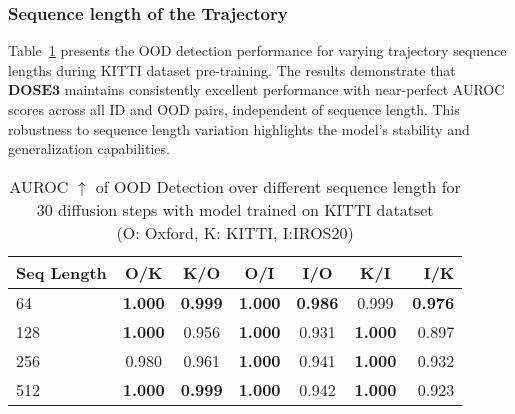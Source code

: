 \subsubsection{Sequence length of the Trajectory}
Table~\ref{tab:ablation_seqlen} presents the \ac{OOD} detection performance for varying trajectory sequence lengths during KITTI dataset pre-training. The results demonstrate that $\mathbf{DOSE3}$ maintains consistently excellent performance with near-perfect AUROC scores across all \ac{ID} and \ac{OOD} pairs, independent of sequence length. This robustness to sequence length variation highlights the model's stability and generalization capabilities.
\begin{table}[t]
\caption{AUROC $\uparrow$ of OOD Detection over different sequence length for 30 diffusion steps with model trained on KITTI datatset\\
(O: Oxford, K: KITTI, I:IROS20)}
    \vskip 0.15in
    \begin{adjustbox}{width=0.68\linewidth,center}
    \begin{tabular}{lcccccr}
    \toprule
        \textbf{Seq Length} & \textbf{O/K} & \textbf{K/O} & \textbf{O/I} & \textbf{I/O} & \textbf{K/I} & \textbf{I/K}\\
    \midrule
        64   & \textbf{1.000} & \textbf{0.999} & \textbf{1.000} & \textbf{0.986} & 0.999 & \textbf{0.976} \\
        128  & \textbf{1.000} & 0.956 & \textbf{1.000} & 0.931 & \textbf{1.000} & 0.897\\
        256  & 0.980 & 0.961 & \textbf{1.000} & 0.941 & \textbf{1.000} & 0.932\\
        512  & \textbf{1.000} & \textbf{0.999} & \textbf{1.000} & 0.942 & \textbf{1.000} & 0.923\\
    \bottomrule
    \end{tabular}
    \end{adjustbox}
    \vskip -0.1in
    
    \label{tab:ablation_seqlen}
\end{table}


